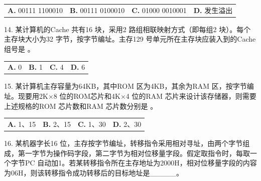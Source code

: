 \documentclass[UTF8,11pt]{ctexart}
\begin{document}
\begin{center}\begin{tabular}{>{\raggedright\arraybackslash}p{\dimexpr(\linewidth-8\tabcolsep)/4\relax}>{\raggedright\arraybackslash}p{\dimexpr(\linewidth-8\tabcolsep)/4\relax}>{\raggedright\arraybackslash}p{\dimexpr(\linewidth-8\tabcolsep)/4\relax}>{\raggedright\arraybackslash}p{\dimexpr(\linewidth-8\tabcolsep)/4\relax}}
\textbf{A.} 00111 1100010 & \textbf{B.} 00111 0100010 & \textbf{C.} 01000 0010001 & \textbf{D.} 发生溢出\\[.35em]\end{tabular}\end{center}

14. 某计算机的Cache 共有16 块，采用2 路组相联映射方式（即每组2 块）。每个主存块大小为32 字节，按字节编址。主存129 号单元所在主存块应装入到的Cache 组号是 。


\begin{center}\begin{tabular}{>{\raggedright\arraybackslash}p{\dimexpr(\linewidth-8\tabcolsep)/4\relax}>{\raggedright\arraybackslash}p{\dimexpr(\linewidth-8\tabcolsep)/4\relax}>{\raggedright\arraybackslash}p{\dimexpr(\linewidth-8\tabcolsep)/4\relax}>{\raggedright\arraybackslash}p{\dimexpr(\linewidth-8\tabcolsep)/4\relax}}
\textbf{A.} 0 & \textbf{B.} 1 & \textbf{C.} 4 & \textbf{D.} 6\\[.35em]\end{tabular}\end{center}

15. 某计算机主存容量为64KB，其中ROM 区为4KB，其余为RAM 区，按字节编址。现要用2K×8 位的ROM芯片和4K×4 位的RAM 芯片来设计该存储器，则需要上述规格的ROM 芯片数和RAM 芯片数分别是 。


\begin{center}\begin{tabular}{>{\raggedright\arraybackslash}p{\dimexpr(\linewidth-8\tabcolsep)/4\relax}>{\raggedright\arraybackslash}p{\dimexpr(\linewidth-8\tabcolsep)/4\relax}>{\raggedright\arraybackslash}p{\dimexpr(\linewidth-8\tabcolsep)/4\relax}>{\raggedright\arraybackslash}p{\dimexpr(\linewidth-8\tabcolsep)/4\relax}}
\textbf{A.} 1、15 & \textbf{B.} 2、15 & \textbf{C.} 1、30 & \textbf{D.} 2、30\\[.35em]\end{tabular}\end{center}

16. 某机器字长16 位，主存按字节编址，转移指令采用相对寻址，由两个字节组成，第一字节为操作码字段，第二字节为相对位移量字段。假定取指令时，每取一个字节PC 自动加1。若某转移指令所在主存地址为2000H，相对位移量字段的内容为06H，则该转移指令成功转移后的目标地址是\_\_\_\_\_。
\end{document}
